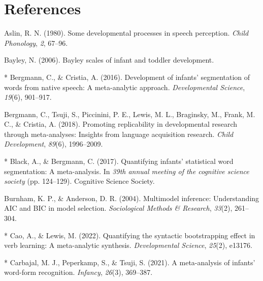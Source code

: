 \documentclass[10pt, letterpaper]{article}
\newenvironment{CSLReferences}%
  {}%
  {\par}
\begin{document}
\hypertarget{references}{%
\section{References}\label{references}}

\setlength{\parindent}{-0.1in} 
\setlength{\leftskip}{0.125in}

\noindent

\hypertarget{refs}{}
\begin{CSLReferences}{1}{0}
\leavevmode{}%
Aslin, R. N. (1980). Some developmental processes in speech perception.
\emph{Child Phonology}, \emph{2}, 67--96.

\leavevmode{}%
Bayley, N. (2006). Bayley scales of infant and toddler development.

\leavevmode{}%
* Bergmann, C., \& Cristia, A. (2016). Development of infants'
segmentation of words from native speech: A meta-analytic approach.
\emph{Developmental Science}, \emph{19}(6), 901--917.

\leavevmode{}%
Bergmann, C., Tsuji, S., Piccinini, P. E., Lewis, M. L., Braginsky, M.,
Frank, M. C., \& Cristia, A. (2018). Promoting replicability in
developmental research through meta-analyses: Insights from language
acquisition research. \emph{Child Development}, \emph{89}(6),
1996--2009.

\leavevmode{}%
* Black, A., \& Bergmann, C. (2017). Quantifying infants' statistical
word segmentation: A meta-analysis. In \emph{39th annual meeting of the
cognitive science society} (pp. 124--129). Cognitive Science Society.

\leavevmode{}%
Burnham, K. P., \& Anderson, D. R. (2004). Multimodel inference:
Understanding AIC and BIC in model selection. \emph{Sociological Methods
\& Research}, \emph{33}(2), 261--304.

\leavevmode{}%
* Cao, A., \& Lewis, M. (2022). Quantifying the syntactic bootstrapping
effect in verb learning: A meta-analytic synthesis. \emph{Developmental
Science}, \emph{25}(2), e13176.

\leavevmode{}%
* Carbajal, M. J., Peperkamp, S., \& Tsuji, S. (2021). A meta-analysis
of infants' word-form recognition. \emph{Infancy}, \emph{26}(3),
369--387.


\end{CSLReferences}
\end{document}
